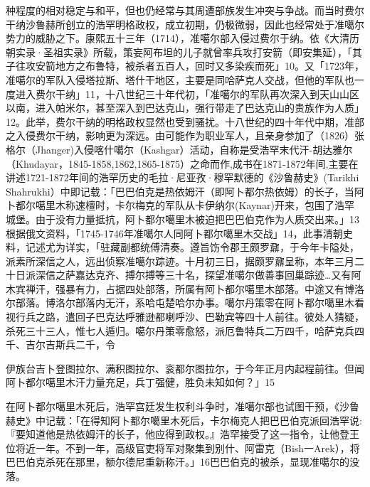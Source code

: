 \noindent 种程度的相对稳定与和平，但也仍经常与其周遭部族发生冲突与争战。而当时费尔干纳沙鲁赫所创立的浩罕明格政权，成立初期，仍极微弱，因此也经常处于准噶尔势力的威胁之下。康熙五十三年（1714），准噶尔部入侵过费尔于纳。依《大清历朝实录·圣祖实录》所载，策妄阿布坦的儿子就曾率兵攻打安箭（即安集延），「其子往攻安箭地方之布鲁特，被杀者五百人，回时又多染疾而死」10。又「1723年，准噶尔的军队入侵塔拉斯、塔什干地区，主要是同哈萨克人交战，但他的军队也一度进入费尔干纳」11，十八世纪三十年代初，「准噶尔的军队再次深入到天山山区以南，进入帕米尔，甚至深入到巴达克山，强行带走了巴达克山的贵族作为人质」12。此举，费尔干纳的明格政权显然也受到骚扰。十八世纪的四十年代中期，准部之入侵费尔干纳，影响更为深远。由可能作为职业军人，且亲身参加了（1826）张格尔（Jhanger)入侵喀什噶尔（Kashgar）活动，自称是受浩罕末代汗-胡达雅尔（Khudayar，1845-1858,1862,1865-1875）之命而作,成书在1871-1872年间,主要在讲述1721-1872年间的浩罕历史的毛拉·尼亚孜·穆罕默德的《沙鲁赫史》(Tarikhi Shahrukhi）中即记载：「巴巴伯克是热依姆汗（即阿卜都尔热依姆）的长子，当阿卜都尔噶里木称速檀时，卡尔梅克的军队从卡伊纳尔(Kaynar)开来，包围了浩罕城堡。由于没有力量抵抗，阿卜都尔噶里木被迫把巴巴伯克作为人质交出来。」13根据俄文资料，「1745-1746年准噶尔人同阿卜都尔噶里木交战」14，此事清朝史料，记述尤为详实，「驻藏副都统傅清奏。遵旨饬令郡王颇罗鼐，于今年卡隘处，派素所深信之人，远出侦察准噶尔踪迹。十月初三日，据颇罗鼐呈称，本年三月二十日派深信之萨嘉达克齐、搏尔搏等三十名，探望准噶尔做善事回巢踪迹…又有阿木宾禅汗，强暴有力，占据四处部落，所属有阿卜都尔噶里木部落。中途又有博洛尔部落。博洛尔部落内无汗，系哈屯楚哈尔办事。噶尔丹策零在阿卜都尔噶里木看视行兵之路，遣回子巴克达呼雅逊都喇呼沙、巴勒宾等四十人前往。彼处人猜疑，杀死三十三人，惟七人遁归。噶尔丹策零愈怒，派厄鲁特兵二万四千，哈萨克兵四千、吉尔吉斯兵二千，令

\vfill
\begin{BookNotes}
\end{BookNotes}

\noindent 伊族台吉卜登图拉尔、满积图拉尔、衮都尔图拉尔，于今年正月内起程前往。但闻阿卜都尔噶里木汗力量充足，兵丁强健，胜负未知如何？」15

在阿卜都尔噶里木死后，浩罕宫廷发生权利斗争时，准噶尔部也试图干预，《沙鲁赫史》中记载：「在得知阿卜都尔噶里木死后，卡尔梅克人把巴巴伯克派回浩罕说:『要知道他是热依姆汗的长子，他应得到政权。』浩罕接受了这一指令，让他登王位将近一年。不到一年，高级官吏将军对聚集到别什、阿雷克（Bish一Arek），将巴巴伯克杀死在那里，额尔德尼重新称汗。」16巴巴伯克的被杀，显现准噶尔的没落。

